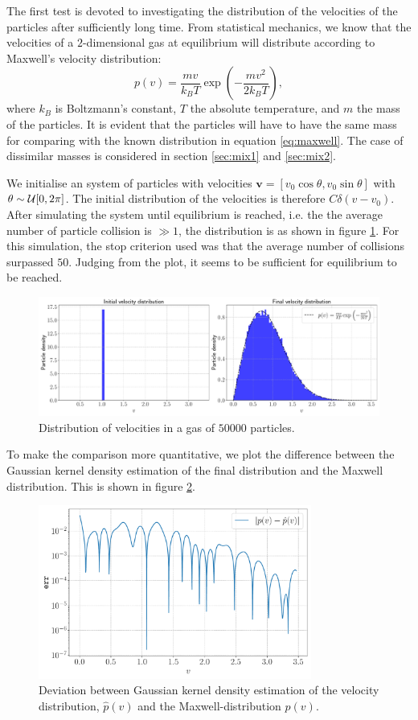 The first test is devoted to investigating the distribution of the velocities of the particles after sufficiently long time. From statistical mechanics, we know that the velocities of a $2$-dimensional gas at equilibrium will distribute according to Maxwell's velocity distribution: 
\begin{equation}\label{eq:maxwell}
	p(v) = \frac{mv}{k_B T} \exp{\left(- \frac{mv^2}{2 k_B T}\right)},
\end{equation}
where $k_B$ is Boltzmann's constant, $T$ the absolute temperature, and $m$ the mass of the particles. It is evident that the particles will have to have the same mass for comparing with the known distribution in equation \ref{eq:maxwell}. The case of dissimilar masses is considered in section \ref{sec:mix1} and \ref{sec:mix2}.

We initialise an system of particles with velocities $\mathbf{v} = [v_0 \cos{\theta} , v_0 \sin{\theta}]$ with $\theta \sim \mathcal{U}[0,2\pi]$. The initial distribution of the velocities is therefore $C\delta (v - v_0)$. After simulating the system until equilibrium is reached, i.e. the the average number of particle collision is $\gg 1$, the distribution is as shown in figure \ref{fig:dist_1}. For this simulation, the stop criterion used was that the average number of collisions surpassed $50$. Judging from the plot, it seems to be sufficient for equilibrium to be reached. 

\begin{figure}[htb]
	\centering
	\includegraphics[width=\textwidth]{../fig/distribution}
	\caption{Distribution of velocities in a gas of $50000$ particles.}
	\label{fig:dist_1}
\end{figure}

To make the comparison more quantitative, we plot the difference between the Gaussian kernel density estimation of the final distribution and the Maxwell distribution. This is shown in figure \ref{fig:dist_2}.

\begin{figure}[htb]
	\centering
	\includegraphics[width=0.8\textwidth]{../fig/kde_diff}
	\caption{Deviation between Gaussian kernel density estimation of the velocity distribution, $\hat{p}(v)$ and the Maxwell-distribution $p(v)$.}
	\label{fig:dist_2}
\end{figure}